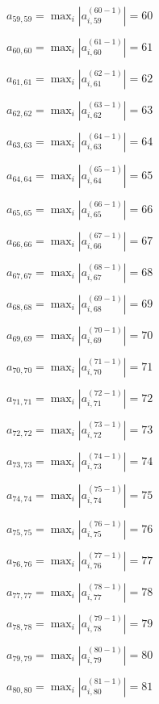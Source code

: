 \documentclass[a4paper,12pt]{article}
\begin{document}
$a _{ 59, 59 } =  \max _i |a _{ i, 59 } ^{ (60 - 1) } | = 60$

$a _{ 60, 60 } =  \max _i |a _{ i, 60 } ^{ (61 - 1) } | = 61$

$a _{ 61, 61 } =  \max _i |a _{ i, 61 } ^{ (62 - 1) } | = 62$

$a _{ 62, 62 } =  \max _i |a _{ i, 62 } ^{ (63 - 1) } | = 63$

$a _{ 63, 63 } =  \max _i |a _{ i, 63 } ^{ (64 - 1) } | = 64$

$a _{ 64, 64 } =  \max _i |a _{ i, 64 } ^{ (65 - 1) } | = 65$

$a _{ 65, 65 } =  \max _i |a _{ i, 65 } ^{ (66 - 1) } | = 66$

$a _{ 66, 66 } =  \max _i |a _{ i, 66 } ^{ (67 - 1) } | = 67$

$a _{ 67, 67 } =  \max _i |a _{ i, 67 } ^{ (68 - 1) } | = 68$

$a _{ 68, 68 } =  \max _i |a _{ i, 68 } ^{ (69 - 1) } | = 69$

$a _{ 69, 69 } =  \max _i |a _{ i, 69 } ^{ (70 - 1) } | = 70$

$a _{ 70, 70 } =  \max _i |a _{ i, 70 } ^{ (71 - 1) } | = 71$

$a _{ 71, 71 } =  \max _i |a _{ i, 71 } ^{ (72 - 1) } | = 72$

$a _{ 72, 72 } =  \max _i |a _{ i, 72 } ^{ (73 - 1) } | = 73$

$a _{ 73, 73 } =  \max _i |a _{ i, 73 } ^{ (74 - 1) } | = 74$

$a _{ 74, 74 } =  \max _i |a _{ i, 74 } ^{ (75 - 1) } | = 75$

$a _{ 75, 75 } =  \max _i |a _{ i, 75 } ^{ (76 - 1) } | = 76$

$a _{ 76, 76 } =  \max _i |a _{ i, 76 } ^{ (77 - 1) } | = 77$

$a _{ 77, 77 } =  \max _i |a _{ i, 77 } ^{ (78 - 1) } | = 78$

$a _{ 78, 78 } =  \max _i |a _{ i, 78 } ^{ (79 - 1) } | = 79$

$a _{ 79, 79 } =  \max _i |a _{ i, 79 } ^{ (80 - 1) } | = 80$

$a _{ 80, 80 } =  \max _i |a _{ i, 80 } ^{ (81 - 1) } | = 81$
\end{document}

